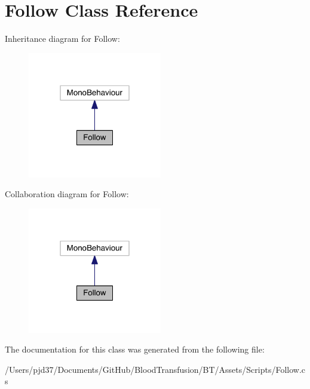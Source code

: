 \hypertarget{class_follow}{}\section{Follow Class Reference}
\label{class_follow}


Inheritance diagram for Follow\+:\nopagebreak
\begin{figure}[H]
\begin{center}
\leavevmode
\includegraphics[width=166pt]{class_follow__inherit__graph}
\end{center}
\end{figure}


Collaboration diagram for Follow\+:\nopagebreak
\begin{figure}[H]
\begin{center}
\leavevmode
\includegraphics[width=166pt]{class_follow__coll__graph}
\end{center}
\end{figure}


The documentation for this class was generated from the following file\+:\begin{DoxyCompactItemize}
\item 
/\+Users/pjd37/\+Documents/\+Git\+Hub/\+Blood\+Transfusion/\+B\+T/\+Assets/\+Scripts/Follow.\+cs\end{DoxyCompactItemize}
